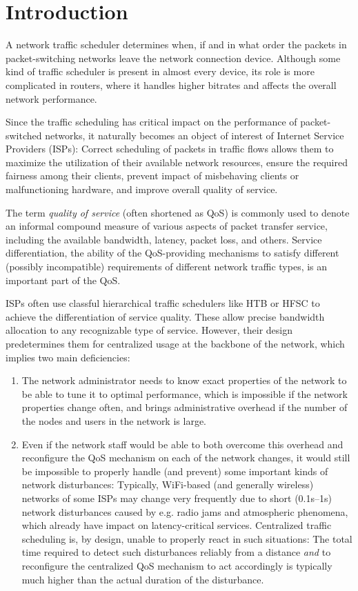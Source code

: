 \chapter*{Introduction}

A network traffic scheduler determines when, if and in what order the packets in packet-switching networks leave the network connection device. Although some kind of traffic scheduler is present in almost every device, its role is more complicated in routers, where it handles higher bitrates and affects the overall network performance.

Since the traffic scheduling has critical impact on the performance of packet-switched networks, it naturally becomes an object of interest of Internet Service Providers (ISPs): Correct scheduling of packets in traffic flows allows them to maximize the utilization of their available network resources, ensure the required fairness among their clients, prevent impact of misbehaving clients or malfunctioning hardware, and improve overall quality of service.

The term \emph{quality of service} (often shortened as QoS) is commonly used to denote an informal compound measure of various aspects of packet transfer service, including the available bandwidth, latency, packet loss, and others. Service differentiation, the ability of the QoS-providing mechanisms to satisfy different (possibly incompatible) requirements of different network traffic types, is an important part of the QoS.

ISPs often use classful hierarchical traffic schedulers like HTB or HFSC to achieve the differentiation of service quality. These allow precise bandwidth allocation to any recognizable type of service. However, their design predetermines them for centralized usage at the backbone of the network, which implies two main deficiencies:
\begin{enumerate}
\item The network administrator needs to know exact properties of the network to be able to tune it to optimal performance, which is impossible if the network properties change often, and brings administrative overhead if the number of the nodes and users in the network is large.
\item Even if the network staff would be able to both overcome this overhead and reconfigure the QoS mechanism on each of the network changes, it would still be impossible to properly handle (and prevent) some important kinds of network disturbances: Typically, WiFi-based (and generally wireless) networks of some ISPs may change very frequently due to short (0.1s--1s) network disturbances caused by e.g. radio jams and atmospheric phenomena, which already have impact on latency-critical services. Centralized traffic scheduling is, by design, unable to properly react in such situations: The total time required to detect such disturbances reliably from a distance \emph{and} to reconfigure the centralized QoS mechanism to act accordingly is typically much higher than the actual duration of the disturbance.
\end{enumerate}

